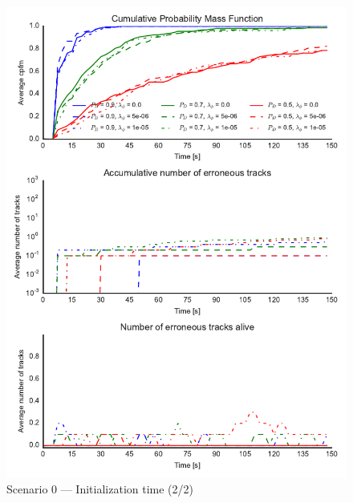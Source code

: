 \begin{figure}
\centering
\includegraphics{Figures/plots/Scenario0_Init-Time(2-2).pdf}
\caption{Scenario 0 --- Initialization time (2/2)}\label{fig:init0_time_2-2}
\end{figure}

